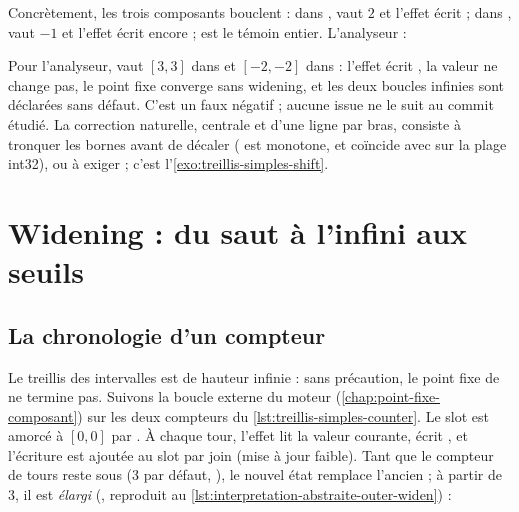 Concrètement, les trois composants bouclent : dans ,
 vaut $2$ et l'effet écrit  ; dans ,
 vaut $-1$ et l'effet écrit encore  ; 
est le témoin entier. L'analyseur :


Pour l'analyseur,  vaut $[3,3]$ dans  et $[-2,-2]$
dans  : l'effet écrit , la valeur ne change
pas, le point fixe converge sans widening, et les deux boucles infinies sont
déclarées sans défaut. C'est un faux négatif ; aucune issue ne le suit au
commit étudié. La correction naturelle, centrale et d'une ligne par bras,
consiste à tronquer les bornes avant de décaler ( est monotone,
et coïncide avec  sur la plage int32), ou à exiger
 ; c'est l'\cref{exo:treillis-simples-shift}.

\section{Widening : du saut à l'infini aux seuils}
\label{sec:treillis-simples-widening}

\subsection{La chronologie d'un compteur}

Le treillis des intervalles est de hauteur infinie : sans précaution, le
point fixe de  ne termine pas. Suivons la boucle externe du
moteur (\cref{chap:point-fixe-composant}) sur les deux compteurs du
\cref{lst:treillis-simples-counter}. Le slot est amorcé à $[0,0]$ par
. À chaque tour, l'effet lit la valeur courante, écrit
, et l'écriture est ajoutée au slot par join (mise à jour
faible). Tant que le compteur de tours  reste sous
 (3 par défaut, ),
le nouvel état remplace l'ancien ; à partir de 3, il est \emph{élargi}
(, reproduit au
\cref{lst:interpretation-abstraite-outer-widen}) :

